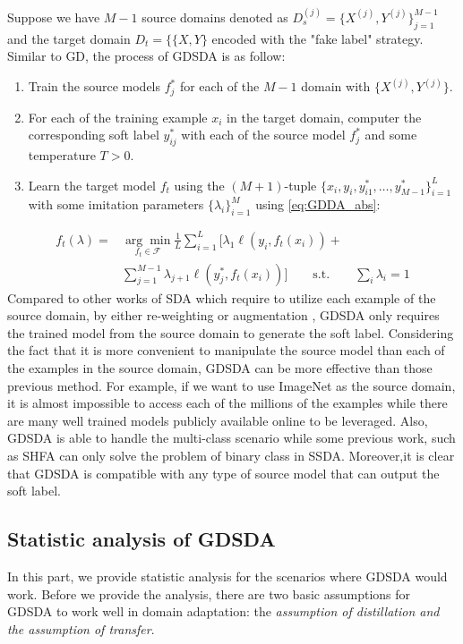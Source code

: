 Suppose we have $M-1$ source domains denoted as $D_s^{(j)}=\{X^{(j)},Y^{(j)}\}_{j=1}^{M-1}$ and the target domain $D_t=\{\{X,Y\}$ encoded with the "fake label" strategy. Similar to GD, the process of GDSDA is as follow:
\begin{enumerate}
    \item Train the source models $f^*_j$ for each of the $M-1$ domain with $\{X^{(j)},Y^{(j)}\}$.
    \item For each of the training example $x_i$ in the target domain, computer the corresponding soft label $y^*_{ij}$ with each of the source model $f^*_j$ and some temperature $T>0$.
    \item Learn the target model $f_t$ using the $(M+1)$-tuple $\{x_i,y_i,y^*_{i1},\dots,y^*_{M-1}\}_{i=1}^L$ with some imitation parameters $\{\lambda_i\}^M_{i=1}$ using \eqref{eq:GDDA_abs}:
\end{enumerate} 
\begin{equation}\label{eq:GDDA_abs}
\begin{aligned}
f_t(\lambda)=&\underset{f_t \in \mathcal{F}}{\arg \min}\frac{1}{L}\sum_{i=1}^{L}[\lambda_1\ell\left(y_i,f_t(x_i)\right)+\\&\sum_{j=1}^{M-1}\lambda_{j+1}\ell\left(y^*_j,f_t(x_i)\right)]\qquad
 \text{s.t.} \qquad \sum_i\lambda_i=1
\end{aligned}
\end{equation}
Compared to other works of SDA which require to utilize each example of the source domain, by either re-weighting \cite{Donahue_2013_CVPR,duan2012visual} or augmentation \cite{daume2010frustratingly}, GDSDA only requires the trained model from the source domain to generate the soft label. Considering the fact that it is more convenient to manipulate the source model than each of the examples in the source domain, GDSDA can be more effective than those previous method. For example, if we want to use ImageNet \cite{imagenet_cvpr09} as the source domain, it is almost impossible to access each of the millions of the examples while there are many well trained models publicly available online to be leveraged. Also, GDSDA is able to handle the multi-class scenario while some previous work, such as SHFA\cite{duan2012learning} can only solve the problem of binary class in SSDA. Moreover,it is clear that GDSDA is compatible with any type of source model that can output the soft label.

\subsection{Statistic analysis of GDSDA}
In this part, we provide statistic analysis for the scenarios where GDSDA would work. Before we provide the analysis, there are two basic assumptions for GDSDA to work well in domain adaptation: the \textit{assumption of distillation and the assumption of  transfer}.

